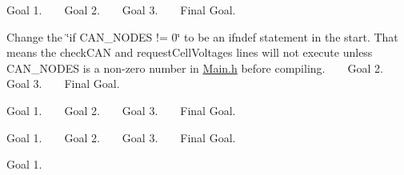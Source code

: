 
\begin{DoxyRefList}
\item[File \mbox{\hyperlink{_c_a_n_8h}{CAN.h}} ]\label{todo__todo000001}%
%
 Goal 1. ~\newline
 ~\newline
 Goal 2. ~\newline
 ~\newline
 Goal 3. ~\newline
 ~\newline
 Final Goal.  
\item[File \mbox{\hyperlink{_c_a_n_8ino}{CAN.ino}} ]\label{todo__todo000002}%
%
 Change the \char`\"{}if CAN\+\_\+\+NODES != 0\char`\"{} to be an ifndef statement in the start. That means the check\+CAN and request\+Cell\+Voltages lines will not execute unless CAN\+\_\+\+NODES is a non-\/zero number in \mbox{\hyperlink{_main_8h}{Main.\+h}} before compiling. ~\newline
 ~\newline
 Goal 2. ~\newline
 ~\newline
 Goal 3. ~\newline
 ~\newline
 Final Goal.  
\item[File \mbox{\hyperlink{_data_logging_8h}{Data\+Logging.h}} ]\label{todo__todo000003}%
%
 Goal 1. ~\newline
 ~\newline
 Goal 2. ~\newline
 ~\newline
 Goal 3. ~\newline
 ~\newline
 Final Goal.  
\item[File \mbox{\hyperlink{_data_logging_8ino}{Data\+Logging.ino}} ]\label{todo__todo000004}%
%
 Goal 1. ~\newline
 ~\newline
 Goal 2. ~\newline
 ~\newline
 Goal 3. ~\newline
 ~\newline
 Final Goal.  
\item[File \mbox{\hyperlink{_display_8h}{Display.h}} ]\label{todo__todo000005}%
%
 Goal 1. ~\newline
 ~\newline

\end{DoxyRefList}
